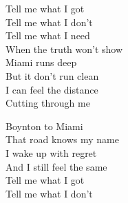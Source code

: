 \begin{lyrics}
Tell me what I got\\
Tell me what I don’t\\
Tell me what I need\\
When the truth won’t show\\
Miami runs deep\\
But it don’t run clean\\
I can feel the distance\\
Cutting through me

Boynton to Miami\\
That road knows my name\\
I wake up with regret\\
And I still feel the same\\
Tell me what I got\\
Tell me what I don’t

\end{lyrics}

